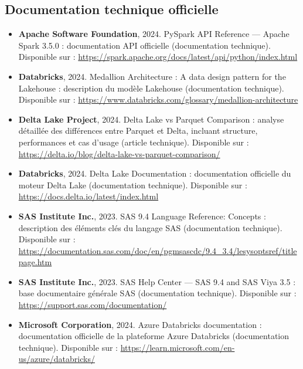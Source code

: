 \subsection*{Documentation technique officielle}

\begin{itemize}[leftmargin=1.5cm]

    \item \textbf{Apache Software Foundation}, 2024. PySpark API Reference — Apache Spark 3.5.0 : documentation API officielle (documentation technique).  
    Disponible sur : \url{https://spark.apache.org/docs/latest/api/python/index.html}

    \item \textbf{Databricks}, 2024. Medallion Architecture : A data design pattern for the Lakehouse : description du modèle Lakehouse (documentation technique).  
    Disponible sur : \url{https://www.databricks.com/glossary/medallion-architecture}

    \item \textbf{Delta Lake Project}, 2024. Delta Lake vs Parquet Comparison : analyse détaillée des différences entre Parquet et Delta, incluant structure, performances et cas d'usage (article technique).  
    Disponible sur : \url{https://delta.io/blog/delta-lake-vs-parquet-comparison/}

    \item \textbf{Databricks}, 2024. Delta Lake Documentation : documentation officielle du moteur Delta Lake (documentation technique).  
    Disponible sur : \url{https://docs.delta.io/latest/index.html}

    \item \textbf{SAS Institute Inc.}, 2023. SAS 9.4 Language Reference: Concepts : description des éléments clés du langage SAS (documentation technique).  
    Disponible sur : \url{https://documentation.sas.com/doc/en/pgmsascdc/9.4_3.4/lesysoptsref/titlepage.htm}

    \item \textbf{SAS Institute Inc.}, 2023. SAS Help Center — SAS 9.4 and SAS Viya 3.5 : base documentaire générale SAS (documentation technique).  
    Disponible sur : \url{https://support.sas.com/documentation/}

    \item \textbf{Microsoft Corporation}, 2024. Azure Databricks documentation : documentation officielle de la plateforme Azure Databricks (documentation technique).  
    Disponible sur : \url{https://learn.microsoft.com/en-us/azure/databricks/}
\end{itemize}

